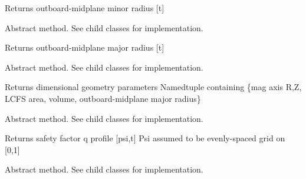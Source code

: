 \documentclass[letterpaper,10pt,english]{sphinxmanual}
\begin{document}
\begin{fulllineitems}
\begin{fulllineitems}
Returns outboard-midplane minor radius {[}t{]}

\end{fulllineitems}


\begin{fulllineitems}
\label{\detokenize{eqtools:eqtools.core.Equilibrium.getRmidOut}}
Abstract method.  See child classes for implementation.

Returns outboard-midplane major radius {[}t{]}

\end{fulllineitems}


\begin{fulllineitems}
\label{\detokenize{eqtools:eqtools.core.Equilibrium.getGeometry}}
Abstract method.  See child classes for implementation.

Returns dimensional geometry parameters
Namedtuple containing \{mag axis R,Z, LCFS area, volume, outboard-midplane major radius\}

\end{fulllineitems}


\begin{fulllineitems}
\label{\detokenize{eqtools:eqtools.core.Equilibrium.getQProfile}}
Abstract method.  See child classes for implementation.

Returns safety factor q profile {[}psi,t{]}
Psi assumed to be evenly-spaced grid on {[}0,1{]}

\end{fulllineitems}


\begin{fulllineitems}
\label{\detokenize{eqtools:eqtools.core.Equilibrium.getQ0}}
Abstract method.  See child classes for implementation.


\end{fulllineitems}
\end{fulllineitems}
\end{document}

